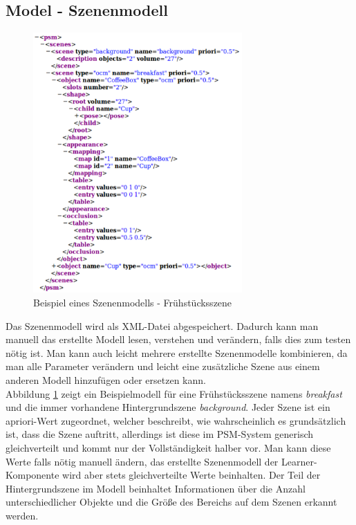 \subsection{Model - Szenenmodell}
\begin{figure}
	\centering
	\includegraphics[width=8cm]{bilder/Modell.pdf}
	\caption{Beispiel eines Szenenmodells - Frühstücksszene \cite{gehrung14}}
	\label{img:modelexample}
\end{figure}
Das Szenenmodell wird als XML-Datei abgespeichert. Dadurch kann man manuell das erstellte Modell lesen, verstehen und verändern, falls dies zum testen nötig ist. Man kann auch leicht mehrere erstellte Szenenmodelle kombinieren, da man alle Parameter verändern und leicht eine zusätzliche Szene aus einem anderen Modell hinzufügen oder ersetzen kann. \smallskip\\ 
Abbildung \ref{img:modelexample} zeigt ein Beispielmodell für eine Frühstücksszene namens \textit{breakfast} und die immer vorhandene Hintergrundszene \textit{background}. Jeder Szene ist ein apriori-Wert zugeordnet, welcher beschreibt, wie wahrscheinlich es grundsätzlich ist, dass die Szene auftritt, allerdings ist diese im PSM-System generisch gleichverteilt und kommt nur der Vollständigkeit halber vor. Man kann diese Werte falls nötig manuell ändern, das erstellte Szenenmodell der Learner-Komponente wird aber stets gleichverteilte Werte beinhalten. Der Teil der Hintergrundszene im Modell beinhaltet Informationen über die Anzahl unterschiedlicher Objekte und die Größe des Bereichs auf dem Szenen erkannt werden.\smallskip\\
